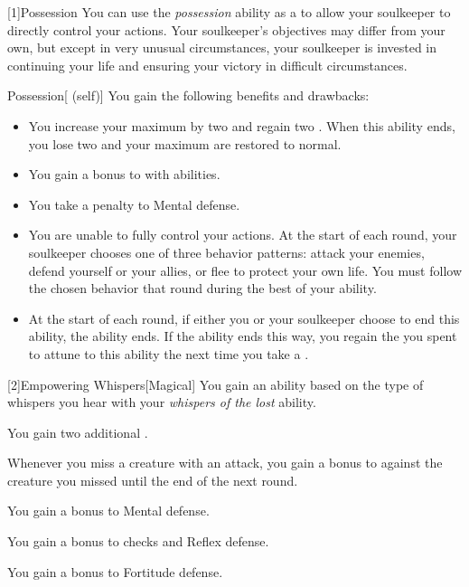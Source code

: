         [1]{Possession} You can use the \textit{possession} ability as a  to allow your soulkeeper to directly control your actions.
        Your soulkeeper's objectives may differ from your own, but except in very unusual circumstances, your soulkeeper is invested in continuing your life and ensuring your victory in difficult circumstances.
        \begin{attuneability}{Possession}[ (self)]
            You gain the following benefits and drawbacks:
            \begin{itemize}
                \item You increase your maximum  by two and regain two .
                    When this ability ends, you lose two  and your maximum  are restored to normal.
                \item You gain a  bonus to  with  abilities.
                \item You take a  penalty to Mental defense.
                \item You are unable to fully control your actions. At the start of each round, your soulkeeper chooses one of three behavior patterns: attack your enemies, defend yourself or your allies, or flee to protect your own life.
                    You must follow the chosen behavior that round during the best of your ability.
                \item At the start of each round, if either you or your soulkeeper choose to end this ability, the ability ends.
                    If the ability ends this way, you regain the  you spent to attune to this ability the next time you take a .
            \end{itemize}
        \end{attuneability}

        [2]{Empowering Whispers}[Magical]
        You gain an ability based on the type of whispers you hear with your \textit{whispers of the lost} ability.
        {
             You gain two additional .

             Whenever you miss a creature with an attack, you gain a  bonus to  against the creature you missed until the end of the next round.

             You gain a  bonus to Mental defense.

             You gain a  bonus to  checks and Reflex defense.

             You gain a  bonus to Fortitude defense.
        }

